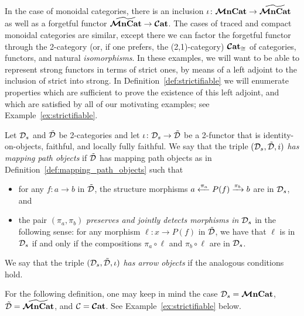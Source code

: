 \documentclass[11pt,oneside,article]{memoir}
\begin{document}
In the case of monoidal categories, there is an inclusion $\iota\colon\bm{\mathcal{M}}\mathbf{nCat}\to\widetilde{\bm{\mathcal{M}}\mathbf{nCat}}$ as
well as a forgetful functor $\widetilde{\bm{\mathcal{M}}\mathbf{nCat}}\to\bm{\mathcal{C}}\mathbf{at}$. The cases of traced and compact monoidal
categories are similar, except there we can factor the forgetful functor through the 2-category (or,
if one prefers, the (2,1)-category) $\bm{\mathcal{C}}\mathbf{at}_{\cong}$ of categories, functors, and natural
\emph{isomorphisms}. In these examples, we will want to be able to represent strong functors in
terms of strict ones, by means of a left adjoint to the inclusion of strict into strong. In
Definition~\ref{def:strictifiable} we will enumerate properties which are sufficient to prove the
existence of this left adjoint, and which are satisfied by all of our motivating examples; see
Example~\ref{ex:strictifiable}.

\begin{definition}
    \label{def:preserve_jdetect_strictness}
  Let $\mathcal{D}_s$ and $\tilde{\mathcal{D}}$ be 2-categories and let $\iota\colon\mathcal{D}_s\to\tilde{\mathcal{D}}$ be a
  2-functor that is identity-on-objects, faithful, and locally fully faithful. We say that the
  triple $(\mathcal{D}_s,\tilde{\mathcal{D}},i)$ \emph{has mapping path objects} if $\tilde{\mathcal{D}}$ has mapping path
  objects as in Definition~\ref{def:mapping_path_objects} such that
  \begin{itemize}
    \item for any $f\colon a\to b$ in $\tilde{\mathcal{D}}$, the structure morphisms
      $a\xleftarrow{\pi_a}P(f)\xrightarrow{\pi_b}b$ are in $\mathcal{D}_s$, and
    \item the pair $(\pi_a,\pi_b)$ \emph{preserves and jointly detects morphisms in $\mathcal{D}_s$} in
      the following sense: for any morphism $\ell\colon x\to P(f)$ in $\tilde{\mathcal{D}}$, we have that
      $\ell$ is in $\mathcal{D}_s$ if and only if the compositions $\pi_a\circ\ell$ and $\pi_b\circ\ell$
      are in $\mathcal{D}_s$.
  \end{itemize}
  We say that the triple $(\mathcal{D}_s,\tilde{\mathcal{D}},\iota)$ \emph{has arrow objects} if the analogous
  conditions hold.
\end{definition}

For the following definition, one may keep in mind the case $\mathcal{D}_s=\bm{\mathcal{M}}\mathbf{nCat}$,
$\tilde{\mathcal{D}}=\widetilde{\bm{\mathcal{M}}\mathbf{nCat}}$, and $\mathcal{C}=\bm{\mathcal{C}}\mathbf{at}$. See Example~\ref{ex:strictifiable} below.
\end{document}
